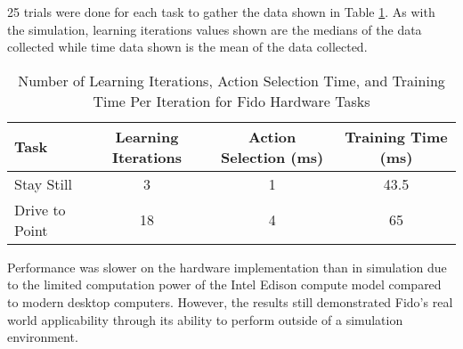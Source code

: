 25 trials were done for each task to gather the data shown in Table \ref{tab:data2}.
As with the simulation, learning iterations values shown are the medians of the data collected while time data shown is the mean of the data collected.

\begin{table}[ht]
	\centering
	\begin{tabular}{@{}lccc@{}}
		\toprule
		Task             & Learning Iterations & Action Selection (ms) & Training Time (ms) \\ \midrule
		Stay Still       & 3                   & 1                    & 43.5                  \\
		Drive to Point   & 18                  & 4                     & 65                  \\
	\end{tabular}
	\caption{Number of Learning Iterations, Action Selection Time, and Training Time Per Iteration for Fido Hardware Tasks}
	\label{tab:data2}
\end{table}

Performance was slower on the hardware implementation than in simulation due to the limited computation power of the Intel Edison compute model compared to modern desktop computers.
However, the results still demonstrated Fido's real world applicability through its ability to perform outside of a simulation environment.
